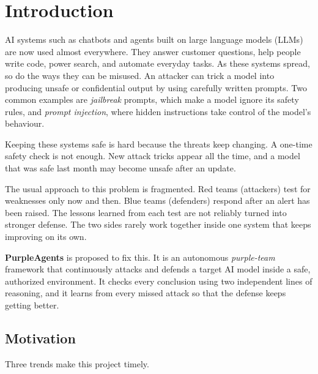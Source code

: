 \chapter{Introduction}

AI systems such as chatbots and agents built on large language models (LLMs) are
now used almost everywhere. They answer customer questions, help people write
code, power search, and automate everyday tasks. As these systems spread, so do
the ways they can be misused. An attacker can trick a model into producing unsafe
or confidential output by using carefully written prompts. Two common examples are
\emph{jailbreak} prompts, which make a model ignore its safety rules, and
\emph{prompt injection}, where hidden instructions take control of the model's
behaviour.

Keeping these systems safe is hard because the threats keep changing. A one-time
safety check is not enough. New attack tricks appear all the time, and a model
that was safe last month may become unsafe after an update.

The usual approach to this problem is fragmented. Red teams (attackers) test for
weaknesses only now and then. Blue teams (defenders) respond after an alert has
been raised. The lessons learned from each test are not reliably turned into
stronger defense. The two sides rarely work together inside one system that keeps
improving on its own.

\textbf{PurpleAgents} is proposed to fix this. It is an autonomous
\emph{purple-team} framework that continuously attacks and defends a target AI
model inside a safe, authorized environment. It checks every conclusion using
two independent lines of reasoning, and it learns from every missed attack so
that the defense keeps getting better.

\section{Motivation}

Three trends make this project timely.

